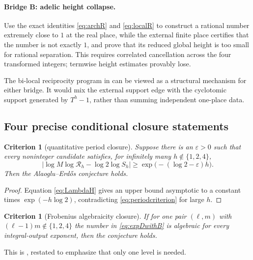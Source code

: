 \documentclass[11pt]{article}
\numberwithin{equation}{section}
\newtheorem{criterion}[theorem]{Criterion}
\theoremstyle{definition}
\theoremstyle{remark}
\begin{document}
\paragraph{Bridge B: adelic height collapse.}
Use the exact identities \eqref{eq:archR} and \eqref{eq:localR} to construct a rational number extremely close to $1$ at the real place, while the external finite place certifies that the number is not exactly $1$, and prove that its reduced global height is too small for rational separation.  This requires correlated cancellation across the four transformed integers; termwise height estimates provably lose.

The bi-local reciprocity program in  can be viewed as a structural mechanism for either bridge.  It would mix the external support edge with the cyclotomic support generated by $T^h-1$, rather than summing independent one-place data.

\subsection{Four precise conditional closure statements}

\begin{criterion}[quantitative period closure]\label{crit:period}
Suppose there is an $\varepsilon>0$ such that every noninteger candidate satisfies, for infinitely many $h\notin\{1,2,4\}$,
\begin{equation}\label{eq:periodcriterion}
  |\log M\log\mathcal R_h-\log2\log S_h|
  \ge \exp\bigl(- (\log2-\varepsilon)h\bigr).
\end{equation}
Then the Alaoglu--Erd\H{o}s conjecture holds.
\end{criterion}

\begin{proof}
Equation \eqref{eq:LambdaH} gives an upper bound asymptotic to a constant times $\exp(-h\log2)$, contradicting \eqref{eq:periodcriterion} for large $h$.
\end{proof}

\begin{criterion}[Frobenius algebraicity closure]\label{crit:algebraicity}
If for one pair $(\ell,m)$ with $(\ell-1)m\notin\{1,2,4\}$ the number in \eqref{eq:expDwithB} is algebraic for every integral-output exponent, then the conjecture holds.
\end{criterion}

This is , restated to emphasize that only one level is needed.
\end{document}
